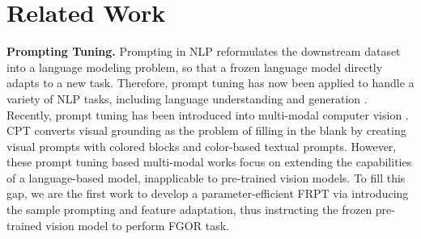 \documentclass[letterpaper]{article} %
\begin{document}
\section{Related Work}
\textbf{Prompting Tuning.}
Prompting \cite{DBLP:journals/corr/abs-2210-00788, DBLP:journals/corr/abs-2207-14381,DBLP:journals/corr/abs-2208-10159} in NLP reformulates the downstream dataset into a language modeling problem, so that a frozen language model directly adapts to a new task. Therefore, prompt tuning has now been applied to handle a variety of NLP tasks, including language understanding and generation \cite{DBLP:conf/emnlp/LesterAC21, DBLP:conf/acl/LiL20, DBLP:journals/corr/abs-2110-07602, DBLP:journals/tacl/JiangXAN20}.
Recently, prompt tuning has been introduced into multi-modal computer vision \cite{ DBLP:conf/icml/RadfordKHRGASAM21,
DBLP:journals/corr/abs-2210-15929, DBLP:journals/corr/abs-2109-11797}. CPT \cite{DBLP:journals/corr/abs-2109-11797} converts visual grounding as the problem of filling in the blank by creating visual prompts with colored blocks and color-based textual prompts.
However, these prompt tuning based multi-modal works focus on extending the capabilities of a language-based model, inapplicable to pre-trained vision models. To fill this gap, we are the first work to develop a parameter-efficient FRPT via introducing the sample prompting and feature adaptation, thus instructing the frozen pre-trained vision model to perform FGOR task.
\end{document}
